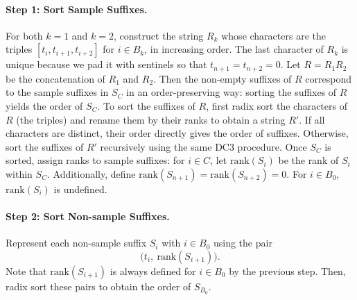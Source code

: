 \paragraph{Step 1: Sort Sample Suffixes.}
For both $k = 1$ and $k = 2$, construct the string $R_k$ whose characters are the triples $[t_i, t_{i+1}, t_{i+2}]$ for $i \in B_k$, in increasing order. 
The last character of $R_k$ is unique because we pad it with sentinels so that $t_{n+1} = t_{n+2} = 0$. Let $R = R_1 R_2$ be the concatenation of $R_1$ and $R_2$.
Then the non-empty suffixes of $R$ correspond to the sample suffixes in $S_C$ in an order-preserving way: sorting the suffixes of $R$ yields the order of $S_C$.
To sort the suffixes of $R$, first radix sort the characters of $R$ (the triples) and rename them by their ranks to obtain a string $R'$. If all characters are distinct, their order directly gives the order of suffixes. Otherwise, sort the suffixes of $R'$ recursively using the same DC3 procedure.
Once $S_C$ is sorted, assign ranks to sample suffixes: for $i \in C$, let $\mathrm{rank}(S_i)$ be the rank of $S_i$ within $S_C$. Additionally, define $\mathrm{rank}(S_{n+1}) = \mathrm{rank}(S_{n+2}) = 0$. For $i \in B_0$, $\mathrm{rank}(S_i)$ is undefined.

\paragraph{Step 2: Sort Non-sample Suffixes.}
Represent each non-sample suffix $S_i$ with $i \in B_0$ using the pair
\[
\bigl(t_i,\ \mathrm{rank}(S_{i+1})\bigr).
\]
Note that $\mathrm{rank}(S_{i+1})$ is always defined for $i \in B_0$ by the previous step. Then, radix sort these pairs to obtain the order of $S_{B_0}$.

